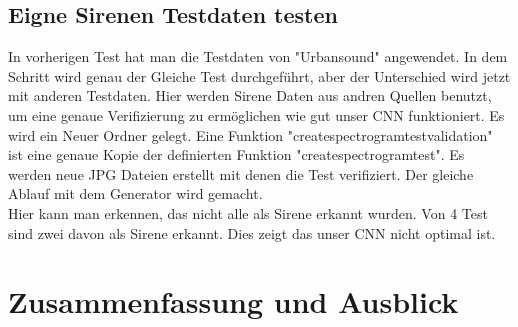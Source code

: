 \documentclass[a4paper,11pt]{article}
\theoremstyle{mytheor}
\begin{document}
\subsection{Eigne Sirenen Testdaten testen}
In vorherigen Test hat man die Testdaten von "Urbansound" angewendet.
In dem Schritt wird genau der Gleiche Test durchgeführt, aber der Unterschied wird jetzt mit anderen Testdaten. Hier werden Sirene Daten aus andren Quellen benutzt, um eine genaue Verifizierung zu ermöglichen wie gut unser CNN funktioniert.
Es wird ein Neuer Ordner gelegt. Eine Funktion "create\textunderscore spectrogram\textunderscore test\textunderscore validation" ist eine genaue Kopie der definierten Funktion "create\textunderscore spectrogram\textunderscore test". Es werden neue JPG Dateien erstellt mit denen die Test verifiziert. Der gleiche Ablauf mit dem Generator wird gemacht. \\
Hier kann man erkennen, das nicht alle als Sirene erkannt wurden. Von 4 Test sind zwei davon als Sirene erkannt. Dies zeigt das unser CNN nicht optimal ist. 

\newpage
\section{Zusammenfassung und Ausblick}
\end{document}
